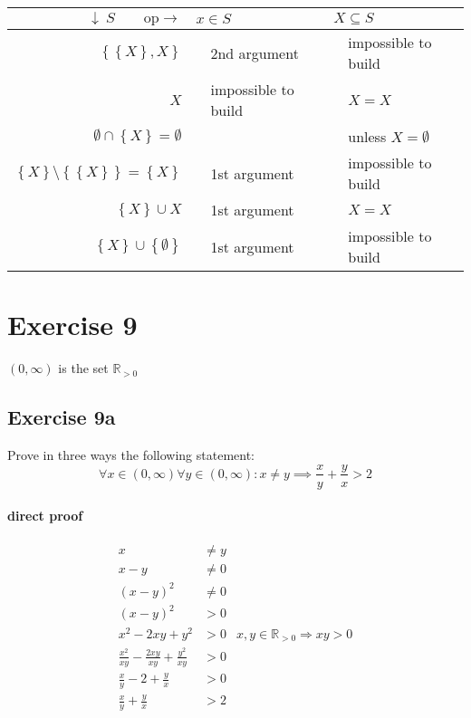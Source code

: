 \documentclass[a4paper]{article}
\theoremstyle{definition}
\newcommand\set[1]{\left\{#1\right\}}
\newcommand\yes{\checkmark}
\newcommand\no{\ding{55}}
\begin{document}
\begin{table}[!h]
 \begin{center}
  \begin{tabular}{rclcl}
   \hline\hline
    $\downarrow \ S \qquad \text{op} \rightarrow$
        & \multicolumn{2}{l}{$x \in S$} & \multicolumn{2}{l}{$X \subseteq S$} \\
   \hline
    $\set{\set{X}, X}$
        & \yes & 2nd argument            & \no  & impossible to build \\
    $X$
        & \no  & impossible to build     & \yes & $X = X$ \\
    $\emptyset \cap \set{X} = \emptyset$
        & \no  &                         & \no  & unless $X = \emptyset$ \\
    $\set{X} \setminus \set{\set{X}} = \set{X}$
        & \yes & 1st argument            & \no  & impossible to build \\
    $\set{X} \cup X$
        & \yes & 1st argument            & \yes & $X = X$ \\
    $\set{X} \cup \set{\emptyset}$
        & \yes & 1st argument            & \no  & impossible to build \\
   \hline
  \end{tabular}
 \end{center}
\end{table}


\section{Exercise 9}

\centerline{ $(0, \infty)$ is the set $\mathbb{R}_{>0}$ }

\subsection{Exercise 9a}

Prove in three ways the following statement:
\[
    \forall x \in (0, \infty) \forall y \in (0, \infty):
    x \neq y \implies \frac xy + \frac yx > 2
\]

\paragraph{direct proof}
\begin{align*}
  x &\neq y \\
  x - y &\neq 0 \\
  (x - y)^2 &\neq 0 \\
  (x - y)^2 &> 0 \\
  x^2 - 2xy + y^2 &> 0    & x,y \in \mathbb{R}_{>0} \Rightarrow xy > 0 \\
  \frac{x^2}{xy} - \frac{2xy}{xy} + \frac{y^2}{xy} &> 0 \\
  \frac{x}{y} - 2 + \frac yx &> 0 \\
  \frac xy + \frac yx &> 2
\end{align*}
\end{document}
